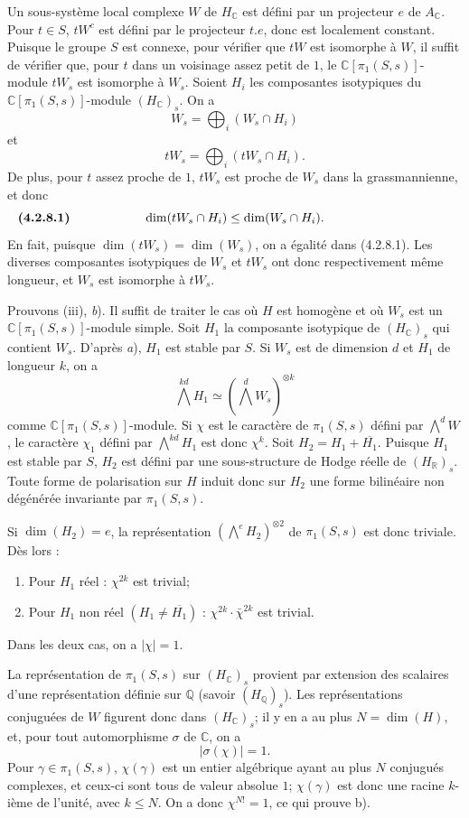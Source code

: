 \documentclass[10pt]{article}
\newcommand{\C}{\mathbb C}
\newcommand{\Q}{\mathbb Q}
\newcommand{\R}{\mathbb R}
\begin{document}
Un sous-système local complexe $W$ de $H_\C$ est défini par un projecteur $e$ de $A_\C$. Pour $t\in S$, $tW^c$ est défini par le projecteur $t.e$, donc est localement constant. Puisque le groupe $S$ est connexe, pour vérifier que $tW$ est isomorphe à $W$, il suffit de vérifier que, pour $t$ dans un voisinage assez petit de $1$, le $\C[\pi_1(S,s)]$-module $tW_s$ est isomorphe à $W_s$. Soient $H_i$ les composantes isotypiques du $\C[\pi_1(S,s)]$-module $(H_\C)_s$. On a
\[
W_s=\bigoplus_i(W_s\cap H_i)
\]
et
\[
tW_s=\bigoplus_i(tW_s\cap H_i).
\]
De plus, pour $t$ assez proche de $1$, $tW_s$ est proche de $W_s$ dans la grassmannienne, et donc
\[
\makebox[\textwidth][s]{\textbf{(4.2.8.1)}\hfill$\displaystyle \dim(tW_s\cap H_i)\le \dim(W_s\cap H_i).$\hfill\phantom{\textbf{(4.2.8.1)}}}
\]
En fait, puisque $\dim(tW_s)=\dim(W_s)$, on a égalité dans (4.2.8.1). Les diverses composantes isotypiques de $W_s$ et $tW_s$ ont donc respectivement même longueur, et $W_s$ est isomorphe à $tW_s$.

Prouvons (iii), \textit{b}). Il suffit de traiter le cas où $H$ est homogène et où $W_s$ est un $\C[\pi_1(S,s)]$-module simple. Soit $H_1$ la composante isotypique de $(H_\C)_s$ qui contient $W_s$. D'après \textit{a}), $H_1$ est stable par $S$. Si $W_s$ est de dimension $d$ et $H_1$ de longueur $k$, on a
\[
\bigwedge^{kd}H_1\simeq(\bigwedge^dW_s)^{\otimes k}
\]
comme $\C[\pi_1(S,s)]$-module. Si $\chi$ est le caractère de $\pi_1(S,s)$ défini par $\bigwedge^dW$, le caractère $\chi_1$ défini par $\bigwedge^{kd}H_1$ est donc $\chi^k$. Soit $H_2=H_1+\overline{H_1}$. Puisque $H_1$ est stable par $S$, $H_2$ est défini par une sous-structure de Hodge réelle de $(H_\R)_s$. Toute forme de polarisation sur $H$ induit donc sur $H_2$ une forme bilinéaire non dégénérée invariante par $\pi_1(S,s)$.

Si $\dim(H_2)=e$, la représentation $(\bigwedge^eH_2)^{\otimes2}$ de $\pi_1(S,s)$ est donc triviale. Dès lors :
\begin{enumerate}[label=\alph*)]
\item Pour $H_1$ réel : $\chi^{2k}$ est trivial;
\item Pour $H_1$ non réel $(H_1\ne\overline{H_1})$ : $\chi^{2k}\cdot\bar\chi^{2k}$ est trivial.
\end{enumerate}
Dans les deux cas, on a $|\chi|=1$.

La représentation de $\pi_1(S,s)$ sur $(H_\C)_s$ provient par extension des scalaires d'une représentation définie sur $\Q$ (savoir $(H_\Q)_s$). Les représentations conjuguées de $W$ figurent donc dans $(H_\C)_s$; il y en a au plus $N=\dim(H)$, et, pour tout automorphisme $\sigma$ de $\C$, on a
\[
|\sigma(\chi)|=1.
\]
Pour $\gamma\in\pi_1(S,s)$, $\chi(\gamma)$ est un entier algébrique ayant au plus $N$ conjugués complexes, et ceux-ci sont tous de valeur absolue $1$; $\chi(\gamma)$ est donc une racine $k$-ième de l'unité, avec $k\le N$. On a donc $\chi^{N!}=1$, ce qui prouve b).
\end{document}
